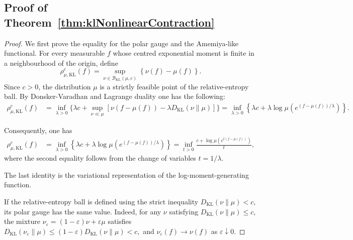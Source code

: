 \documentclass[11pt]{article}
\theoremstyle{plain}
\theoremstyle{remark}
\begin{document}
\subsection{Proof of Theorem~\ref{thm:klNonlinearContraction}}\label{app:proofKLNonlinearContraction}
\begin{proof}
We first prove the equality for the polar gauge and the Amemiya-like functional. For every measurable $f$ whose centred exponential moment is
finite in a neighbourhood of the origin, define
\begin{equation}
    \rho_{\mu,\mathrm{KL}}^c(f)
    =
    \sup_{\nu\in\mathcal B_{\mathrm{KL}}(\mu,c)}
    \left\{
        \nu(f)-\mu(f)
    \right\}.
\end{equation}
Since $c>0$, the distribution $\mu$ is a strictly feasible point of
the relative-entropy ball. 
By Donsker-Varadhan and Lagrange duality one has the following:
\begin{align}
    \rho_{\mu,\mathrm{KL}}^c(f)
    &=
    \inf_{\lambda>0}
    \Bigg\{
        \lambda c
        +
        \sup_{\nu\ll\mu}
        \left[
            \nu\left(f-\mu(f)\right)
            -
            \lambda D_{\mathrm{KL}}(\nu\|\mu)
        \right]
    \Bigg\}=
    \inf_{\lambda>0}
    \left\{
        \lambda c
        +
        \lambda
        \log\mu\left(
            e^{(f-\mu(f))/\lambda}
        \right)
    \right\}.
\end{align}

Consequently, one has
\begin{align}
    \rho_{\mu,\mathrm{KL}}^c(f)
    &=
    \inf_{\lambda>0}
    \left\{
        \lambda c
        +
        \lambda
        \log\mu\left(
            e^{(f-\mu(f))/\lambda}
        \right)
    \right\}
    =
    \inf_{t>0}
    \frac{
        c+
        \log\mu\left(
            e^{t(f-\mu(f))}
        \right)
    }{t},
    \label{eq:klPolarGaugeMGF}
\end{align}
where the second equality follows from the change of variables
$t=1/\lambda$.

The last identity is the variational representation of the
log-moment-generating function.

If the relative-entropy ball is defined using the strict inequality
$D_{\mathrm{KL}}(\nu\|\mu)<c$, its polar gauge has the same value.
Indeed, for any $\nu$ satisfying
$D_{\mathrm{KL}}(\nu\|\mu)\leq c$, the mixture $
    \nu_\varepsilon
    =
    (1-\varepsilon)\nu+\varepsilon\mu$
 satisfies $
    D_{\mathrm{KL}}(\nu_\varepsilon\|\mu)
    \leq
    (1-\varepsilon)
    D_{\mathrm{KL}}(\nu\|\mu)
    <
    c,$
and $\nu_\varepsilon(f)\to\nu(f)$ as
$\varepsilon\downarrow0$.


\end{proof}
\end{document}
